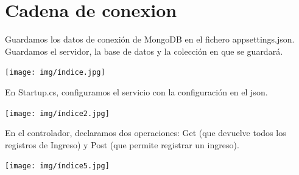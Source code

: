 \documentclass[12pt,letterpaper]{article}
\begin{document}
\section{Cadena de conexion }

Guardamos los datos de conexión de MongoDB en el fichero appsettings.json. Guardamos el servidor, la base de datos y la colección en que se guardará.

\begin{center}
    \texttt{[image: img/índice.jpg]}  
\end{center}

En Startup.cs, configuramos el servicio con la configuración en el json.

\begin{center}
    \texttt{[image: img/índice2.jpg]}  
\end{center}

En el controlador, declaramos dos operaciones: Get (que devuelve todos los registros de Ingreso) y Post (que permite registrar un ingreso).

\begin{center}
    \texttt{[image: img/índice5.jpg]}  
\end{center}
\end{document}
